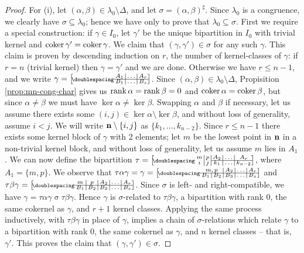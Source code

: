 \begin{lemma}
\begin{proof}
    For (i), let $(\alpha, \beta) \in \lambda_0 \setminus \Delta$, and let
    $\sigma = (\alpha, \beta)^\sharp$.  Since $\lambda_0$ is a congruence, we
    clearly have $\sigma \subseteq \lambda_0$; hence we have only to prove that
    $\lambda_0 \subseteq \sigma$.  First we require a special construction: if
    $\gamma \in I_0$, let $\gamma'$ be the unique bipartition in $I_0$ with
    trivial kernel and $\operatorname{coker}\gamma' = \operatorname{coker}\gamma$.  We claim that
    $(\gamma, \gamma') \in \sigma$ for any such $\gamma$.  This claim is proven
    by descending induction on $r$, the number of kernel-classes of $\gamma$: if
    $r = n$ (trivial kernel) then $\gamma = \gamma'$ and we are done.  Otherwise
    we have $r \leq n-1$, and we write
    $\gamma = \bipart{c|c|c}{1-3}{A_1&\ldots&A_r}{B_1&\ldots&B_s}$.  Since
    $(\alpha,\beta) \in \lambda_0 \setminus \Delta$, Propisition
    \ref{prop:mn-cong-char} gives us $\operatorname{rank}\alpha = \operatorname{rank}\beta = 0$ and
    $\operatorname{coker}\alpha = \operatorname{coker}\beta$, but since $\alpha \neq \beta$ we must have
    $\ker\alpha \neq \ker\beta$.  Swapping $\alpha$ and $\beta$ if necessary,
    let us assume there exists some $(i,j) \in \ker\alpha \setminus \ker\beta$,
    and without loss of generality, assume $i < j$.  We will write
    $\mathbf{n} \setminus \{i,j\}$ as $\{k_1, \ldots, k_{n-2}\}$.  Since $r \leq n-1$
    there exists some kernel block of $\gamma$ with 2 elements; let $m$
    be the lowest point in $\mathbf{n}$ in a non-trivial kernel block, and without loss
    of generality, let us assume $m$ lies in $A_1$.  We can now define the
    bipartition $\tau = \bipart{c|c|c|c|c}{3-5}
    {m & p & A_2 & \ldots & A_r}
    {i & j & k_1 & \ldots & k_{n-2}}$, 
    where $A_1 = \{m, p\}$.
    We observe that $\tau \alpha \gamma = \gamma = \bipart{c|c|c|c|c}{1-5}
    {\mc2{c|}{m,p} & A_2 & \ldots & A_r}
    {B_1 & B_2 & B_3 & \ldots & B_s}$ and
    $\tau \beta \gamma = \bipart{c|c|c|c|c}{1-5}
    {m & p & A_2 & \ldots & A_r}
    {B_1 & B_2 & B_3 & \ldots & B_s}$.
    Since $\sigma$ is left- and right-compatible, we have
    $\gamma = \tau\alpha\gamma \mathrel\sigma \tau\beta\gamma$.  Hence $\gamma$
    is $\sigma$-related to $\tau\beta\gamma$, a bipartition with rank $0$, the
    same cokernel as $\gamma$, and $r+1$ kernel classes.  Applying the same
    process inductively, with $\tau\beta\gamma$ in place of $\gamma$, implies a
    chain of $\sigma$-relations which relate $\gamma$ to a bipartition with rank
    $0$, the same cokernel as $\gamma$, and $n$ kernel classes -- that is,
    $\gamma'$.  This proves the claim that $(\gamma, \gamma') \in \sigma$.


\end{proof}
\end{lemma}
